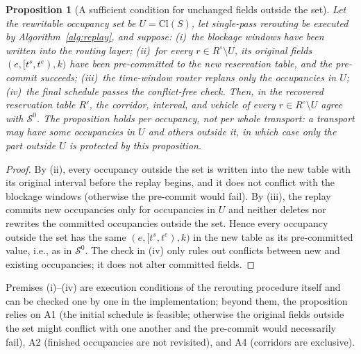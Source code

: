 \documentclass[manuscript,screen,review]{acmart}
\newtheorem{prop}{Proposition}
\begin{document}
\begin{prop}[A sufficient condition for unchanged fields outside the set]
\label{prop:outside}
Let the rewritable occupancy set be \(U=\mathrm{Cl}(S)\), let single-pass rerouting be executed by Algorithm~\ref{alg:replay}, and suppose:
(i)~the blockage windows have been written into the routing layer; (ii)~for every \(r\in R^{\circ}\setminus U\), its original fields \((e,[t^s,t^e),k)\)
have been pre-committed to the new reservation table, and the pre-commit succeeds; (iii)~the time-window router replans only the occupancies in \(U\);
(iv)~the final schedule passes the conflict-free check.
Then, in the recovered reservation table \(R'\), the corridor, interval, and vehicle of every \(r\in R^{\circ}\setminus U\) agree with \(\mathcal{S}^0\).
The proposition holds per occupancy, not per whole transport: a transport may have some occupancies in \(U\)
and others outside it, in which case only the part outside \(U\) is protected by this proposition.
\end{prop}

\begin{proof}
By (ii), every occupancy outside the set is written into the new table with its original interval before the replay begins, and it does not conflict with the blockage windows
(otherwise the pre-commit would fail). By (iii), the replay commits new occupancies only for occupancies in \(U\) and neither deletes nor rewrites the committed occupancies outside the set.
Hence every occupancy outside the set has the same \((e,[t^s,t^e),k)\) in the new table as its pre-committed value, i.e., as in \(\mathcal{S}^0\).
The check in (iv) only rules out conflicts between new and existing occupancies; it does not alter committed fields.
\end{proof}

Premises (i)--(iv) are execution conditions of the rerouting procedure itself and can be checked one by one in the implementation; beyond them, the proposition relies on
A1 (the initial schedule is feasible; otherwise the original fields outside the set might conflict with one another and the pre-commit would necessarily fail),
A2 (finished occupancies are not revisited), and A4 (corridors are exclusive).
\end{document}
